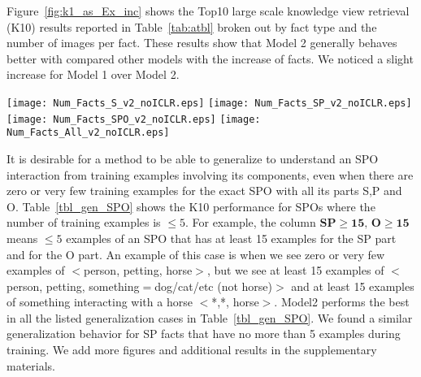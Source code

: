 \documentclass[runningheads]{llncs}
\begin{document}
Figure~\ref{fig:k1_as_Ex_inc} shows the Top10 large scale knowledge view retrieval (K10) results reported in Table~\ref{tab:atbl} broken out by fact type  and the number of images per fact. These results show that Model 2 generally behaves better with compared other models with the increase of facts. We noticed a slight increase for Model 1 over Model 2.
\begin{figure*}[t!]
  \texttt{[image: Num\_Facts\_S\_v2\_noICLR.eps]}
        \texttt{[image: Num\_Facts\_SP\_v2\_noICLR.eps]}
       \texttt{[image: Num\_Facts\_SPO\_v2\_noICLR.eps]}
             \texttt{[image: Num\_Facts\_All\_v2\_noICLR.eps]}
        \caption{K10 Performance ($y$-axis) versus the number of images per fact ($x$-axis). Top Left: Objects (S), Top Right: Attributed Objects and Objects performing Actions (SP), Bottom Left: Interactions (SPO), Bottom Right: All Facts.}
        \label{fig:k1_as_Ex_inc}
          \vspace{-5mm}
\end{figure*}%
It is desirable for a method to be able to generalize to understand an SPO interaction from training examples involving its components, even when there are zero or very few training examples for the exact SPO  with all its parts S,P and O. Table~\ref{tbl_gen_SPO} shows the K10 performance for SPOs where the number of training examples is $\le 5$.
For example, the column $\textbf{SP$\ge$15, O$\ge$15}$  means $\le 5$ examples of an SPO that has at least 15 examples for the SP part and for the O part. An example of this case is when we see zero or very few examples of $<$person, petting, horse$>$, but we see at least 15 examples of $<$person, petting, something$=$dog/cat/etc (not horse)$>$ and at least 15 examples of something interacting with a horse $<$*,*, horse$>$. Model2  performs the best in all the listed generalization cases in   Table~\ref{tbl_gen_SPO}.
We found a similar generalization behavior for SP facts that have no more than 5 examples during training. We add more figures and additional results in the supplementary materials.
\end{document}
